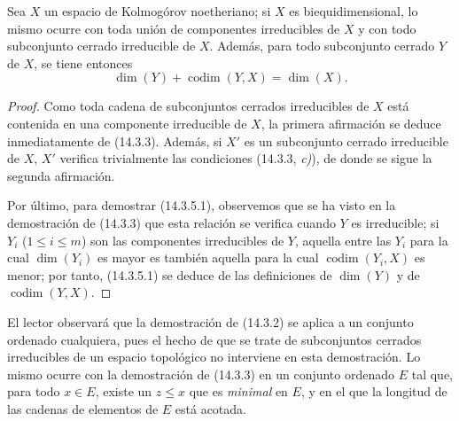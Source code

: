 \begin{corollary}[14.3.5]
\label{0.14.3.5-fr}
Sea $X$ un espacio de Kolmogórov noetheriano; si $X$ es biequidimensional, lo
mismo ocurre con toda unión de componentes irreducibles de $X$ y con todo
subconjunto cerrado irreducible de $X$. Además, para todo subconjunto cerrado
$Y$ de $X$, se tiene entonces
\[
  \dim(Y)+\operatorname{codim}(Y,X)=\dim(X).
  \tag{14.3.5.1}\label{0.14.3.5.1-fr}
\]
\end{corollary}

\begin{proof}
Como toda cadena de subconjuntos cerrados irreducibles de $X$ está contenida en
una componente irreducible de $X$, la primera afirmación se deduce
inmediatamente de (14.3.3). Además, si $X'$ es un subconjunto cerrado
irreducible de $X$, $X'$ verifica trivialmente las condiciones (14.3.3, \emph{c)}), de
donde se sigue la segunda afirmación.

Por último, para demostrar (14.3.5.1), observemos que se ha visto en la
demostración de (14.3.3) que esta relación se verifica cuando $Y$ es
irreducible; si $Y_i$ ($1\leq i\leq m$) son las componentes irreducibles de
$Y$, aquella entre las $Y_i$ para la cual $\dim(Y_i)$ es mayor es también
aquella para la cual $\operatorname{codim}(Y_i,X)$ es menor; por tanto,
(14.3.5.1) se deduce de las definiciones de $\dim(Y)$ y de
$\operatorname{codim}(Y,X)$.
\end{proof}

\begin{remark}[14.3.6]
\label{0.14.3.6-fr}
El lector observará que la demostración de (14.3.2) se aplica a un conjunto
ordenado cualquiera, pues el hecho de que se trate de subconjuntos cerrados
irreducibles de un espacio topológico no interviene en esta demostración. Lo
mismo ocurre con la demostración de (14.3.3) en un conjunto ordenado $E$ tal
que, para todo $x\in E$, existe un $z\leq x$ que es \emph{minimal} en $E$, y en
el que la longitud de las cadenas de elementos de $E$ está acotada.
\end{remark}
